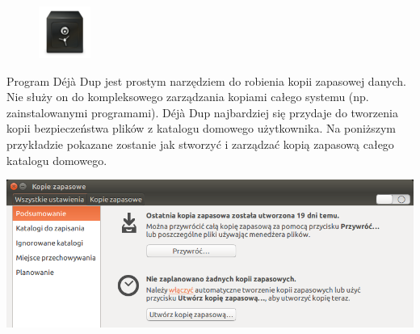 \begin{figure}
	\vspace{-10pt}
	\includegraphics[width=\linewidth]{images/ikony_deja-dup.png}
\end{figure}

Program \textcolor{ubuntu_orange}{Déjà Dup} jest prostym narzędziem do robienia kopii zapasowej danych. Nie służy on do kompleksowego zarządzania kopiami całego systemu (np. zainstalowanymi programami). Déjà Dup najbardziej się przydaje do tworzenia kopii bezpieczeństwa plików z katalogu domowego użytkownika. Na poniższym przykładzie pokazane zostanie jak stworzyć i zarządzać kopią zapasową całego katalogu domowego.

\begin{center}
	\includegraphics[width=\linewidth]{images/programy_dejavu1.png}
\end{center}

